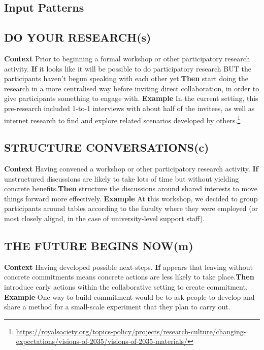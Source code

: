 \documentclass[acmlarge,timestamp]{acmart}
\newcommand{\sensory}{(s)}
\newcommand{\cognitive}{(c)}
\newcommand{\motor}{(m)}
\begin{document}
\subsection{Input Patterns}

\subsection*{DO YOUR RESEARCH{\hfill\sensory}}
\textbf{Context} Prior to beginning a formal workshop or other participatory research activity.\newline
\textbf{If} it looks like it will be possible to do participatory research BUT the participants haven’t begun speaking with each other yet.\newline \textbf{Then}
start doing the research in a more centralised way before inviting direct collaboration, in order to give participants something to engage with.\newline
\textbf{Example} In the current setting, this pre-research included 1-to-1 interviews with about half of the invitees, as well as internet research to find and explore related scenarios developed by others.\footnote{\url{https://royalsociety.org/topics-policy/projects/research-culture/changing-expectations/visions-of-2035/visions-of-2035-materials/}}

\subsection*{STRUCTURE CONVERSATIONS{\hfill\cognitive}}
\textbf{Context} Having convened a workshop or other participatory research activity.\newline
\textbf{If} unstructured discussions are likely to take lots of time but without yielding concrete benefits.\newline \textbf{Then}
structure the discussions around shared interests to move things forward more effectively.\newline
\textbf{Example} At this workshop, we decided to group participants around tables according to the faculty where they were employed (or most closely alignd, in the case of university-level support staff).

\subsection*{THE FUTURE BEGINS NOW{\hfill\motor}}
\textbf{Context} Having developed possible next steps.\newline
\textbf{If} appears that leaving without concrete commitments means
concrete actions are less likely to take place.\newline \textbf{Then}
introduce early actions within the
collaborative setting to create commitment.\newline
\textbf{Example} One way to build commitment would be to ask people to develop and share a method for a small-scale experiment that they plan to carry out.
\end{document}
